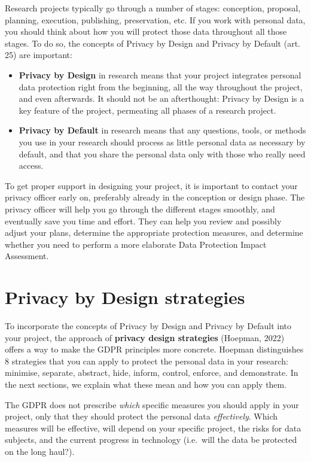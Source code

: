 \documentclass[
]{book}
\providecommand{\tightlist}{%
  \setlength{\itemsep}{0pt}\setlength{\parskip}{0pt}}
\begin{document}
Research projects typically go through a number of stages: conception, proposal,
planning, execution, publishing, preservation, etc. If you work with personal
data, you should think about how you will protect those data throughout all
those stages. To do so, the concepts of Privacy by Design and Privacy by Default
(art. 25) are
important:

\begin{itemize}
\tightlist
\item
  \textbf{Privacy by Design} in research means that your project integrates personal
  data protection right from the beginning, all the way throughout the project,
  and even afterwards. It should not be an afterthought: Privacy by Design is a
  key feature of the project, permeating all phases of a research project.
\item
  \textbf{Privacy by Default} in research means that any questions, tools, or methods
  you use in your research should process as little personal data as necessary by
  default, and that you share the personal data only with those who really need
  access.
\end{itemize}

To get proper support in designing your project, it is important to contact your
privacy officer
early on, preferably already in the conception or design phase. The privacy
officer will help you go through the different stages smoothly, and eventually
save you time and effort. They can help you review and possibly adjust your
plans, determine the appropriate protection measures, and determine whether you
need to perform a more elaborate Data Protection Impact Assessment.

\hypertarget{design-strategies}{%
\section{Privacy by Design strategies}\label{design-strategies}}

To incorporate the concepts of Privacy by Design and Privacy by Default into
your project, the approach of \textbf{privacy design strategies}
(Hoepman, 2022)
offers a way to make the GDPR principles more concrete. Hoepman distinguishes 8
strategies that you can apply to protect the personal data in your research:
minimise, separate, abstract, hide, inform, control, enforce, and demonstrate.
In the next sections, we explain what these mean and how you can apply them.

The GDPR does not prescribe \emph{which} specific measures you should apply in your
project, only that they should protect the personal data \emph{effectively}. Which
measures will be effective, will depend on your specific project, the risks for
data subjects, and the current progress in technology (i.e.~will the data be
protected on the long haul?).
\end{document}
